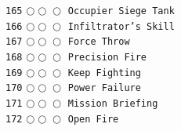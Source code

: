 \documentclass[a4paper,landscape]{article}
\begin{document}
\begin{multicols*}{5}
\texttt{165} \(\bigcirc\!\bigcirc\!\bigcirc\)  \texttt{Occupier Siege Tank} \vspace{-0.3mm}\\ 
\texttt{166} \(\bigcirc\!\bigcirc\!\bigcirc\)  \texttt{Infiltrator's Skill} \vspace{-0.3mm}\\ 
\texttt{167} \(\bigcirc\!\bigcirc\!\bigcirc\)  \texttt{Force Throw} \vspace{-0.3mm}\\ 
\texttt{168} \(\bigcirc\!\bigcirc\!\bigcirc\)  \texttt{Precision Fire} \vspace{-0.3mm}\\ 
\texttt{169} \(\bigcirc\!\bigcirc\!\bigcirc\)  \texttt{Keep Fighting} \vspace{-0.3mm}\\ 
\texttt{170} \(\bigcirc\!\bigcirc\!\bigcirc\)  \texttt{Power Failure} \vspace{-0.3mm}\\ 
\texttt{171} \(\bigcirc\!\bigcirc\!\bigcirc\)  \texttt{Mission Briefing} \vspace{-0.3mm}\\ 
\texttt{172} \(\bigcirc\!\bigcirc\!\bigcirc\)  \texttt{Open Fire} \vspace{-0.3mm}\\ 

\end{multicols*}
\end{document}
